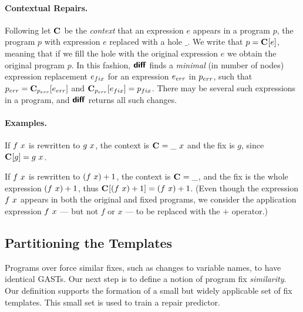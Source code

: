 \paragraph{Contextual Repairs.}
%
Following \cite{Felleisen92} let $\mathbf{C}_{}$ be the \emph{context} that an
expression $e$ appears in a program $p$, \ie the program $p$ with expression $e$
replaced with a hole $\_$.
%
We write that $p = \mathbf{C}_{}[e]$, meaning that if we fill the hole with the
original expression $e$ we obtain the original program $p$.
%
In this fashion, $\bm{\mathsf{diff}}$ finds a \emph{minimal} (in number of nodes)
expression replacement $e_{fix}$ for an expression $e_{err}$ in $p_{err}$, such that
$p_{err} = \mathbf{C}_{p_{err}}[e_{err}]$ and $\mathbf{C}_{p_{err}}[e_{fix}] = p_{fix}$.
%
There may be several such expressions in a program, and $\bm{\mathsf{diff}}$ returns all
such changes.

\paragraph{Examples.} If $f\ x$ is rewritten to $g\ x$, the context is
$\mathbf{C}_{} = \_\ x$ and the fix is $g$, since $\mathbf{C}_{}[g] = g\ x$.

If $f\ x$ is rewritten to $(f\ x) + 1$, the
context is $\mathbf{C}_{} = \_$, and the fix
is the whole expression $(f\ x) + 1$, thus
$\mathbf{C}_{}[(f\ x) + 1] = (f\ x) + 1$.
(Even though the expression $f\ x$ appears in both the original and fixed programs,
we consider
the application expression $f\ x$ --- but not $f$ or $x$ --- to be replaced
with the $+$ operator.)

\subsection{Partitioning the Templates}

Programs over \lang force similar fixes, such as changes to variable names, to
have identical GASTs. Our next step is to define a notion of program fix
\emph{similarity}. Our definition supports the formation of a small but widely
applicable set of fix templates. This small set is used to train a repair
predictor.

\label{subsec:partitioning}

